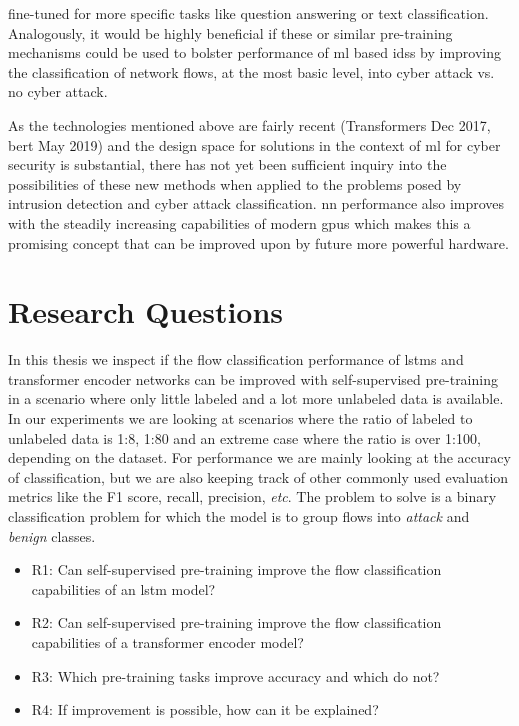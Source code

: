 fine-tuned for more specific tasks like question answering or text classification. Analogously, it would be highly beneficial if these or similar pre-training mechanisms could be used to bolster performance of \gls{ml} based \glspl{ids} by improving the classification of network flows, at the most basic level, into cyber attack vs. no cyber attack. \par
As the technologies mentioned above are fairly recent (Transformers Dec 2017, \gls{bert} May 2019) and the design space for solutions in the context of \gls{ml} for cyber security is substantial, there has not yet been sufficient inquiry into the possibilities of these new methods when applied to the problems posed by intrusion detection and cyber attack classification. \gls{nn} performance also improves with the steadily increasing capabilities of modern \glspl{gpu} which makes this a promising concept that can be improved upon by future more powerful hardware. 


\section{Research Questions} \label{sect.research_questions}

In this thesis we inspect if the flow classification performance of \glspl{lstm} and transformer encoder networks can be improved with self-supervised pre-training in a scenario where only little labeled and a lot more unlabeled data is available. In our experiments we are looking at scenarios where the ratio of labeled to unlabeled data is 1:8, 1:80 and an extreme case where the ratio is over 1:100, depending on the dataset. For performance we are mainly looking at the accuracy of classification, but we are also keeping track of other commonly used evaluation metrics like the F1 score, recall, precision, \textit{etc}. The problem to solve is a binary classification problem for which the model is to group flows into \textit{attack} and \textit{benign} classes. 

\begin{itemize}
	\item R1: Can self-supervised pre-training improve the flow classification capabilities of an \gls{lstm} model?
	\item R2: Can self-supervised pre-training improve the flow classification capabilities of a transformer encoder model?
	\item R3: Which pre-training tasks improve accuracy and which do not?
	\item R4: If improvement is possible, how can it be explained?
\end{itemize}


